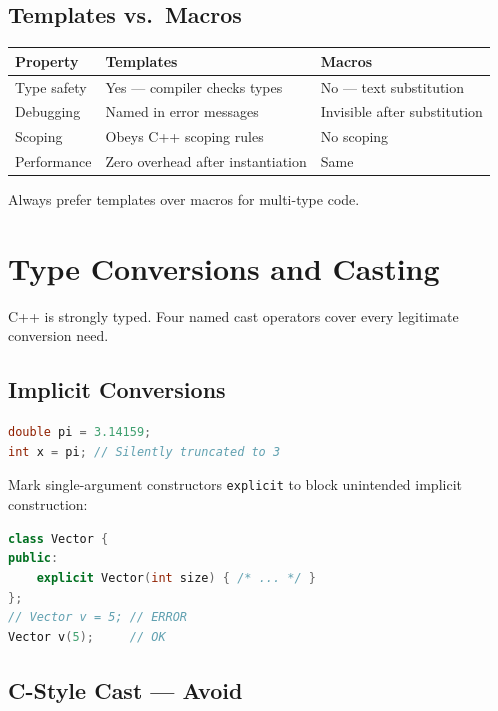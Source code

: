 \subsection{Templates vs.\ Macros}

\begin{center}
\begin{tabular}{|l|l|l|}
\hline
\textbf{Property} & \textbf{Templates} & \textbf{Macros} \\
\hline
Type safety   & Yes --- compiler checks types & No --- text substitution \\
Debugging     & Named in error messages       & Invisible after substitution \\
Scoping       & Obeys C++ scoping rules       & No scoping \\
Performance   & Zero overhead after instantiation & Same \\
\hline
\end{tabular}
\end{center}

Always prefer templates over macros for multi-type code.

\section{Type Conversions and Casting}
\label{sec:casting}

C++ is strongly typed. Four named cast operators cover every legitimate conversion need.

\subsection{Implicit Conversions}

\begin{lstlisting}[language=C++, caption={Implicit truncation}]
double pi = 3.14159;
int x = pi; // Silently truncated to 3
\end{lstlisting}

Mark single-argument constructors \texttt{explicit} to block unintended implicit construction:

\begin{lstlisting}[language=C++, caption={explicit constructor prevents silent conversions}]
class Vector {
public:
    explicit Vector(int size) { /* ... */ }
};
// Vector v = 5; // ERROR
Vector v(5);     // OK
\end{lstlisting}

\subsection{C-Style Cast --- Avoid}

